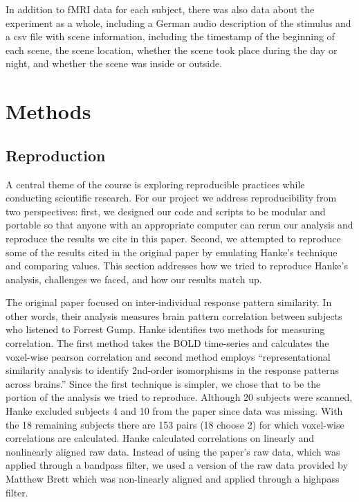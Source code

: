 \documentclass[11pt]{article}
\begin{document}
In addition to fMRI data for each subject, there was also data about the
experiment as a whole, including a German audio description of the stimulus
and a csv file with scene information, including the timestamp of the
beginning of each scene, the scene location, whether the scene took place
during the day or night, and whether the scene was inside or outside.

\section{Methods}

\subsection{Reproduction} A central theme of the course is exploring
reproducible practices while conducting scientific research. For our project
we address reproducibility from two perspectives: first, we designed our code
and scripts to be modular and portable so that anyone with an appropriate
computer can rerun our analysis and reproduce the results we cite in this
paper. Second, we attempted to reproduce some of the results cited in the
original paper by emulating Hanke’s technique and comparing values. This
section addresses how we tried to reproduce Hanke’s analysis, challenges we
faced, and how our results match up.

The original paper focused on inter-individual response pattern similarity. In
other words, their analysis measures brain pattern correlation between
subjects who listened to Forrest Gump. Hanke identifies two methods for
measuring correlation. The first method takes the BOLD time-series and
calculates the voxel-wise pearson correlation and second method employs
“representational similarity analysis to identify 2nd-order isomorphisms in
the response patterns across brains.” Since the first technique is simpler, we
chose that to be the portion of the analysis we tried to reproduce. Although
20 subjects were scanned, Hanke excluded subjects 4 and 10 from the paper
since data was missing. With the 18 remaining subjects there are 153 pairs (18
choose 2) for which voxel-wise correlations are calculated. Hanke calculated
correlations on linearly and nonlinearly aligned raw data. Instead of using
the paper’s raw data, which was applied through a bandpass filter, we used a
version of the raw data provided by Matthew Brett which was non-linearly
aligned and applied through a highpass filter.
\end{document}
